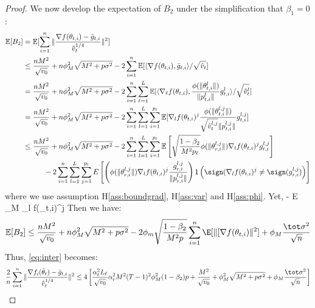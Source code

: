 \documentclass{article}
\begin{document}
\begin{proof}
We now develop the expectation of $B_2$ under the simplification that $\beta_1 = 0$:
\begin{align}\notag
    \mathbb E[B_2]&=\mathbb E[\sum_{i=1}^n\Vert \frac{\nabla f(\theta_{t,i})-\bar g_{t,i}}{\hat v_t^{1/4}} \Vert^2] \\\notag
    &\leq \frac{nM^2}{\sqrt{v_0}}+n\phi_M^2\sqrt{M^2+p\sigma^2}-2\sum_{i=1}^n\mathbb E[\langle \nabla f(\theta_{t,i}),\bar g_{t,i} \rangle/\sqrt{\hat v_t}]\\\notag
    &=\frac{nM^2}{\sqrt{v_0}}+n\phi_M^2\sqrt{M^2+p\sigma^2}-2\sum_{i=1}^n \sum_{\ell=1}^L \mathbb E[\langle \nabla_\ell f(\theta_{t,i}),\frac{\phi(\|\theta_{t,i}^l \|)}{\| p_{t,i}^l \|}g_{t,i}^l \rangle/\sqrt{\hat v_t^l}]\\\notag
    &=\frac{nM^2}{\sqrt{v_0}}+n\phi_M^2\sqrt{M^2+p\sigma^2}-2\sum_{i=1}^n \sum_{l=1}^L\sum_{i=1}^{p_l} \mathbb E[\nabla_l f(\theta_{t,i})^j\frac{\phi(\|\theta_{t,i}^{l,j} \|)}{\sqrt{\hat v_t^{l,j}}\| p_{t,i}^{l,j} \|}g_{t,i}^{l,j} ]\\\notag
    & \leq \frac{nM^2}{\sqrt{v_0}}+n\phi_M^2\sqrt{M^2+p\sigma^2}-2\sum_{i=1}^n \sum_{l=1}^L\sum_{i=1}^{p_l} \mathbb E \left[ \sqrt{\frac{1-\beta_2}{M^2 p_\ell}}  \phi(\|\theta_{r,i}^{l,j}\|)  \nabla_l f(\theta_{t,i})^j  g_{t,i}^{l,j}\right]\\\notag
    &\hspace{0.4in} -2 \sum_{i = 1}^n \sum_{l=1}^L\sum_{j=1}^{p_l}  E \left[  \left( \phi(\|\theta_{r,i}^{l,j}\|)   \nabla_l f(\theta_{t,i})^j   \frac{g_{r,i}^{l,j}}{ \|p_{r,i}^{l,j}\|}\right)\mathsf{1}\left( \sign(  \nabla_l f(\theta_{t,i})^j \neq  \sign( g_{r,i}^{l,j}) \right)\right]
\end{align}
where we use assumption H\ref{ass:boundgrad}, H\ref{ass:var} and H\ref{ass:phi}. 
Yet,
\beq\notag
- \mathbb E  \leq  \phi_M \nabla_l f(\theta_{t,i})^j   
\eeq
Then we have:
\begin{align}\notag
    \mathbb E[B_2]\leq  \frac{nM^2}{\sqrt{v_0}}+n\phi_M^2\sqrt{M^2+p\sigma^2}-2 \phi_m \sqrt{\frac{1-\beta_2}{M^2 p}} \sum_{i=1}^n \E[\| [\nabla f(\theta_{t,i}) \|^2] + \phi_M \frac{\tot \sigma^2}{\sqrt{n}}
\end{align}
Thus, \eqref{eq:inter} becomes:
\begin{align}\notag
    \frac{2}{n}\sum_{i=1}^n\Vert \frac{\nabla f_i(\bar\theta_t)-\bar g_{t,i}}{\hat v_t^{1/4}} \Vert^2 \leq 4 \left[ \frac{\alpha_t^2 L_\ell}{\sqrt{v_0}} \alpha_r^2 M^2 (T-1)^2 \phi_M^2 (1-\beta_2)p + \frac{M^2}{\sqrt{v_0}}+\phi_M^2\sqrt{M^2+p\sigma^2} + \phi_M \frac{\tot \sigma^2}{\sqrt{n}}\right]
\end{align}


\end{proof}
\end{document}
